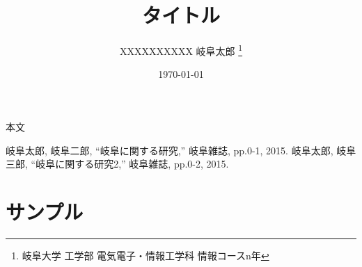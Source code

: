 \documentclass[10pt, a4j]{jsarticle}
\title{タイトル}
\author{XXXXXXXXXX 岐阜太郎 \footnote{岐阜大学 工学部 電気電子・情報工学科 情報コースn年}}
\date{\today}
\def\linesparpage#1{\baselineskip=\textheight
   \divide\baselineskip by #1}
\begin{document}
%
\maketitle
%
本文
%
\begin{thebibliography}{9}
     岐阜太郎, 岐阜二郎, ``岐阜に関する研究,'' 岐阜雑誌, pp.0-1, 2015.
     岐阜太郎, 岐阜三郎, ``岐阜に関する研究2,'' 岐阜雑誌, pp.0-2, 2015.
\end{thebibliography}
%
\appendix
\section{サンプル}

%
\end{document}
